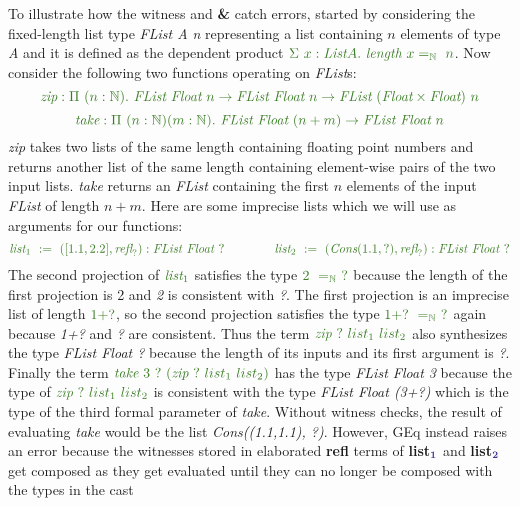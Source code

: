 \documentclass{article}
\theoremstyle{definition}
\newcommand{\Gcode}[1]{{\color{OliveGreen}\textit{#1}}}
\newcommand{\Ccode}[1]{{\color{BlueViolet}\textbf{#1}}}
\newcommand{\Gcmath}[1]{{\color{OliveGreen}#1}}
\newcommand{\Ccmath}[1]{{\color{BlueViolet}\boldsymbol{#1}}}
\begin{document}
To illustrate how the witness and \Ccode{\&} catch errors,
\citet{eremondi_propositional_2022} started by considering the fixed-length list
type \Gcode{FList A n} representing a list containing \(n\) elements of type
\Gcode{A} and it is defined as the dependent product \(\Gcmath{\Sigma\ x
  :\textit{List} A.\ \textit{length}\ x =_\mathbb{N}\ n}\). Now consider the
following two functions operating on \Gcode{FList}s:
\[\Gcmath{\textit{zip}:\Pi\ (n:\mathbb{N}).\
    \textit{FList}\ \textit{Float}\ n \to \textit{FList}\ \textit{Float}\ n
    \to \textit{FList}\ (\textit{Float}\times\textit{Float})\ n}\]
\[\Gcmath{\textit{take}:\Pi\ (n:\mathbb{N}) (m:\mathbb{N}).\
    \textit{FList}\ \textit{Float}\ (n+m) \to
    \textit{FList}\ \textit{Float}\ n}\] \Gcode{zip} takes two lists of the same
length containing floating point numbers and returns another list of the same
length containing element-wise pairs of the two input lists. \Gcode{take}
returns an \Gcode{FList} containing the first \(n\) elements of the input
\Gcode{FList} of length \(n + m\). Here are some imprecise lists which we will
use as arguments for our functions:
\[\Gcmath{\textit{list}_1\ :=\ ([1.1,2.2], \textit{refl}_?):\textit{FList Float } ?}
\quad \quad \quad \quad \Gcmath{\textit{list}_2\ :=\ (\textit{Cons}(1.1, ?),
  \textit{refl}_?):\textit{FList Float } ?}\] The second projection of
\(\Gcmath{\textit{list}_1}\) satisfies the type \(\Gcmath{2\ =_\mathbb{N}\ ?}\)
because the length of the first projection is 2 and \Gcode{2} is consistent with
\Gcode{?}. The first projection is an imprecise list of length \(\Gcmath{1+?}\),
so the second projection satisfies the type \(\Gcmath{1+?\ =_\mathbb{N}\ ?}\)
again because \Gcode{1+?} and \Gcode{?} are consistent. Thus the term
\(\Gcmath{\textit{zip}\ ?\ list_1\ list_2}\) also synthesizes the type
\Gcode{FList Float ?} because the length of its inputs and its first argument is
\Gcode{?}. Finally the term
\(\Gcmath{\textit{take}\ 3\ ?\ (\textit{zip}\ ?\ list_1\ list_2)}\) has the type
\Gcode{FList Float 3} because the type of
\(\Gcmath{\textit{zip}\ ?\ list_1\ list_2}\) is consistent with the type
\Gcode{FList Float (3+?)} which is the type of the third formal parameter of
\Gcode{take}. Without witness checks, the result of evaluating \Gcode{take}
would be the list \Gcode{Cons((1.1,1.1), ?)}. However, GEq instead raises an
error because the witnesses stored in elaborated \Ccode{refl} terms of
\Ccode{list}\(\Ccmath{_1}\) and \Ccode{list}\(\Ccmath{_2}\) get composed as they
get evaluated until they can no longer be composed with the types in the cast
\end{document}

